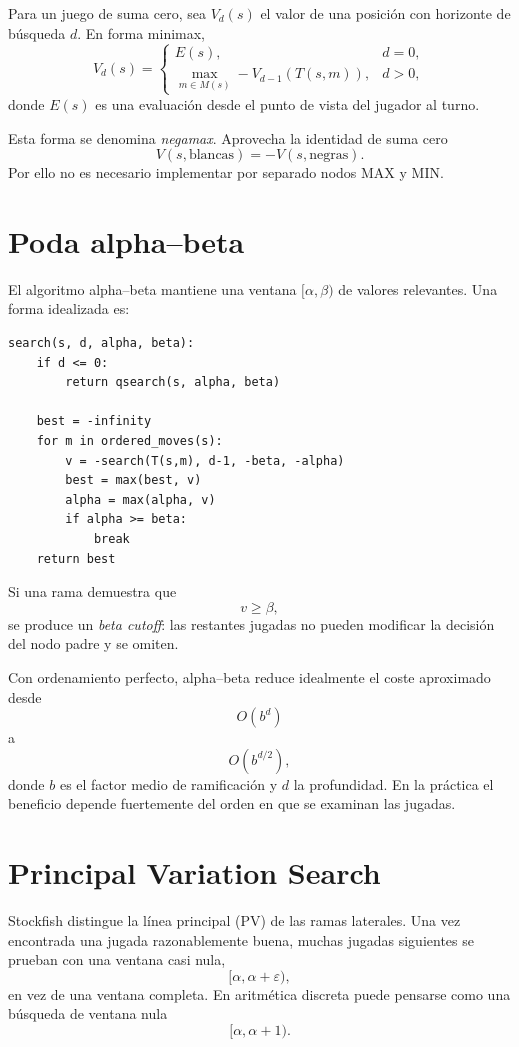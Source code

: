 \documentclass[11pt,a4paper]{article}
\begin{document}
Para un juego de suma cero, sea $V_d(s)$ el valor de una posición con horizonte de búsqueda $d$. En forma minimax,
\[
V_d(s)=
\begin{cases}
E(s), & d=0,\\
\max\limits_{m\in M(s)} -V_{d-1}(T(s,m)), & d>0,
\end{cases}
\]
donde $E(s)$ es una evaluación desde el punto de vista del jugador al turno.

Esta forma se denomina \emph{negamax}. Aprovecha la identidad de suma cero
\[
V(s,\text{blancas})=-V(s,\text{negras}).
\]
Por ello no es necesario implementar por separado nodos MAX y MIN.

\section{Poda alpha--beta}

El algoritmo alpha--beta mantiene una ventana $[\alpha,\beta)$ de valores relevantes. Una forma idealizada es:

\begin{lstlisting}
search(s, d, alpha, beta):
    if d <= 0:
        return qsearch(s, alpha, beta)

    best = -infinity
    for m in ordered_moves(s):
        v = -search(T(s,m), d-1, -beta, -alpha)
        best = max(best, v)
        alpha = max(alpha, v)
        if alpha >= beta:
            break
    return best
\end{lstlisting}

Si una rama demuestra que
\[
    v \ge \beta,
\]
se produce un \emph{beta cutoff}: las restantes jugadas no pueden modificar la decisión del nodo padre y se omiten.

Con ordenamiento perfecto, alpha--beta reduce idealmente el coste aproximado desde
\[
O(b^d)
\]
a
\[
O(b^{d/2}),
\]
donde $b$ es el factor medio de ramificación y $d$ la profundidad. En la práctica el beneficio depende fuertemente del orden en que se examinan las jugadas.

\section{Principal Variation Search}

Stockfish distingue la línea principal (PV) de las ramas laterales. Una vez encontrada una jugada razonablemente buena, muchas jugadas siguientes se prueban con una ventana casi nula,
\[
[\alpha,\alpha+\varepsilon),
\]
en vez de una ventana completa. En aritmética discreta puede pensarse como una búsqueda de ventana nula
\[
[\alpha,\alpha+1).
\]
\end{document}
